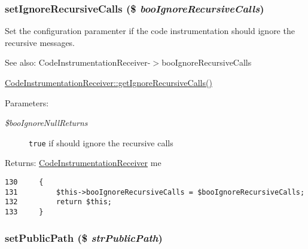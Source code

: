 \hypertarget{class_code_instrumentation_receiver_9d58160ec1e8b7bb322fb4ee60f47998}{
\subsubsection[{setIgnoreRecursiveCalls}]{\setlength{\rightskip}{0pt plus 5cm}setIgnoreRecursiveCalls (\$ {\em booIgnoreRecursiveCalls})}}
\label{class_code_instrumentation_receiver_9d58160ec1e8b7bb322fb4ee60f47998}


Set the configuration paramenter if the code instrumentation should ignore the recursive messages.

\begin{Desc}
\item[See also:]CodeInstrumentationReceiver-$>$booIgnoreRecursiveCalls 

\hyperlink{class_code_instrumentation_receiver_9827f39df527b013a3d967215cac31d1}{CodeInstrumentationReceiver::getIgnoreRecursiveCalls()} \end{Desc}
\begin{Desc}
\item[Parameters:]
\begin{description}
\item[{\em \$booIgnoreNullReturns}]{\tt true} if should ignore the recursive calls \end{description}
\end{Desc}
\begin{Desc}
\item[Returns:]\hyperlink{class_code_instrumentation_receiver}{CodeInstrumentationReceiver} me \end{Desc}


\begin{Code}\begin{verbatim}130     {
131         $this->booIgnoreRecursiveCalls = $booIgnoreRecursiveCalls;
132         return $this;
133     }
\end{verbatim}
\end{Code}


\hypertarget{class_code_instrumentation_receiver_261f2bb173e655f2ead64eda4c29e76a}{
\subsubsection[{setPublicPath}]{\setlength{\rightskip}{0pt plus 5cm}setPublicPath (\$ {\em strPublicPath})}}
\label{class_code_instrumentation_receiver_261f2bb173e655f2ead64eda4c29e76a}


